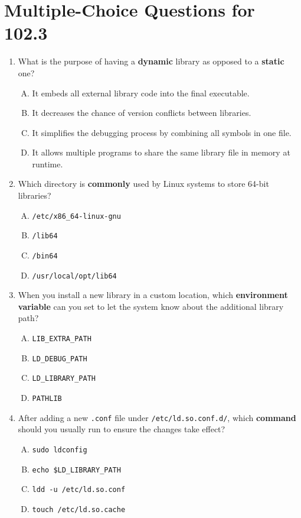 \documentclass[a4paper]{report}
\begin{document}
\section*{Multiple-Choice Questions for 102.3}
\begin{enumerate}[1.]

    \item What is the purpose of having a \textbf{dynamic} library as opposed to a \textbf{static} one?  
    \begin{enumerate}[A)]
        \item It embeds all external library code into the final executable.  
        \item It decreases the chance of version conflicts between libraries.  
        \item It simplifies the debugging process by combining all symbols in one file.  
        \item It allows multiple programs to share the same library file in memory at runtime.  
    \end{enumerate}

    \item Which directory is \textbf{commonly} used by Linux systems to store 64-bit libraries?  
    \begin{enumerate}[A)]
        \item \texttt{/etc/x86\_64-linux-gnu}  
        \item \texttt{/lib64}  
        \item \texttt{/bin64}  
        \item \texttt{/usr/local/opt/lib64}  
    \end{enumerate}

    \item When you install a new library in a custom location, which \textbf{environment variable} can you set to let the system know about the additional library path?  
    \begin{enumerate}[A)]
        \item \texttt{LIB\_EXTRA\_PATH}  
        \item \texttt{LD\_DEBUG\_PATH}  
        \item \texttt{LD\_LIBRARY\_PATH}  
        \item \texttt{PATHLIB}  
    \end{enumerate}

    \item After adding a new \texttt{.conf} file under \texttt{/etc/ld.so.conf.d/}, which \textbf{command} should you usually run to ensure the changes take effect?  
    \begin{enumerate}[A)]
        \item \texttt{sudo ldconfig}  
        \item \texttt{echo \$LD\_LIBRARY\_PATH}  
        \item \texttt{ldd -u /etc/ld.so.conf}  
        \item \texttt{touch /etc/ld.so.cache}  
    \end{enumerate}


\end{enumerate}
\end{document}

